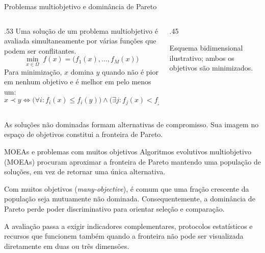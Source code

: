 \begin{frame}{Problemas multiobjetivo e dominância de Pareto}
\begin{columns}[T,onlytextwidth]
\begin{column}{.53\textwidth}
Uma solução de um problema multiobjetivo é avaliada simultaneamente por várias funções que podem ser conflitantes.
\[
\min_{x\in\Omega}\; f(x)=\bigl(f_1(x),\ldots,f_M(x)\bigr)
\]
Para minimização, $x$ domina $y$ quando não é pior em nenhum objetivo e é melhor em pelo menos um:
\[
x\prec y\iff\bigl(\forall i:f_i(x)\le f_i(y)\bigr)\land
\bigl(\exists j:f_j(x)<f_j(y)\bigr).
\]
\end{column}
\begin{column}{.45\textwidth}
\centering
{}
\vspace{.1cm}
{\scriptsize Esquema bidimensional ilustrativo; ambos os objetivos são minimizados.}
\end{column}
\end{columns}
\vspace{.15cm}
As soluções não dominadas formam alternativas de compromisso. Sua imagem no espaço de objetivos constitui a fronteira de Pareto.
\end{frame}

\begin{frame}{MOEAs e problemas com muitos objetivos}
Algoritmos evolutivos multiobjetivo (MOEAs) procuram aproximar a fronteira de Pareto mantendo uma população de soluções, em vez de retornar uma única alternativa.
\par\medskip
Com muitos objetivos (\textit{many-objective}), é comum que uma fração crescente da população seja mutuamente não dominada. Consequentemente, a dominância de Pareto perde poder discriminativo para orientar seleção e comparação.
\par\medskip
A avaliação passa a exigir indicadores complementares, protocolos estatísticos e recursos que funcionem também quando a fronteira não pode ser visualizada diretamente em duas ou três dimensões.
\end{frame}


